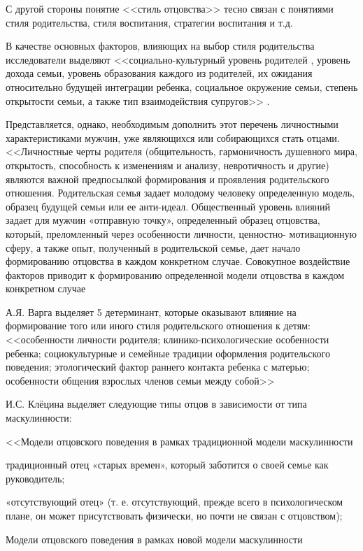 \documentclass{../../common/thesisbyxetex}
\begin{document}
С другой стороны понятие <<стиль отцовства>> тесно связан с понятиями стиля родительства, стиля 
воспитания, стратегии воспитания и т.д. 



В качестве основных факторов, влияющих на выбор стиля родительства исследователи выделяют  
<<социально-культурный уровень
родителей , уровень дохода семьи, уровень
образования каждого из родителей, их ожидания относительно будущей интеграции
ребенка, социальное окружение семьи, степень открытости семьи, а также тип
взаимодействия супругов>> \cite[286]{strat}.

Представляется, однако, необходимым дополнить этот перечень личностными характеристиками мужчин, 
уже являющихся или собирающихся стать отцами. <<Личностные черты родителя
(общительность, гармоничность душевного мира, открытость, способность к
изменениям и анализу, невротичность и другие) являются важной предпосылкой
формирования и проявления родительского отношения. Родительская семья задает
молодому человеку определенную модель, образец будущей семьи или ее анти-идеал.
Общественный уровень влияний задает для мужчин «отправную точку», определенный
образец отцовства, который, преломленный через особенности личности, ценностно-
мотивационную сферу, а также опыт, полученный в родительской семье, дает начало
формированию отцовства в каждом конкретном случае. Совокупное воздействие
факторов приводит к формированию определенной модели отцовства в каждом
конкретном случае \cite[122]{har}


А.Я. Варга выделяет 5 детерминант, которые оказывают влияние на формирование того или иного стиля
родительского отношения к детям: <<особенности личности родителя; клинико-психологические
особенности ребенка; социокультурные и семейные традиции оформления родительского поведения;
этологический фактор раннего контакта ребенка с матерью; особенности общения взрослых членов семьи
между собой>> \cite[16]{varga}

И.С. Клёцина выделяет следующие типы отцов в зависимости от типа маскулинности:

<<Модели отцовского поведения в рамках традиционной модели маскулинности

традиционный отец «старых времен», который заботится о своей семье как руководитель;

«отсутствующий отец» (т. е. отсутствующий, прежде всего в психологическом плане, он может
присутствовать физически, но почти не связан с отцовством);

Модели отцовского поведения в рамках новой модели маскулинности
\end{document}
